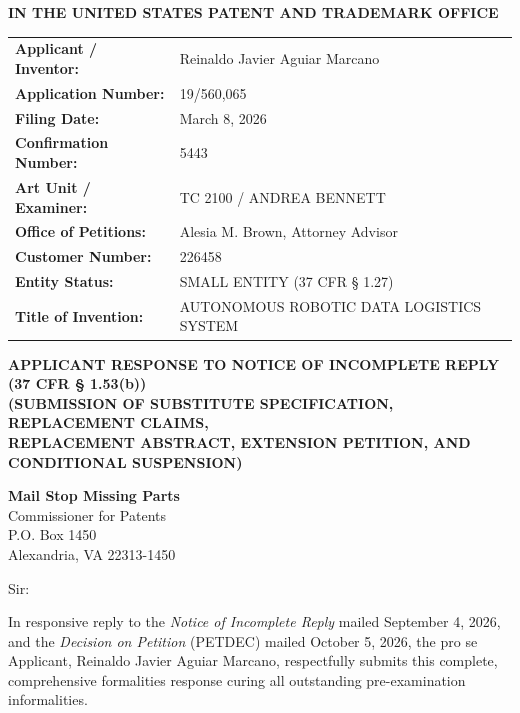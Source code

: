 \documentclass[11pt,letterpaper]{article}
\begin{document}
\thispagestyle{empty}

\begin{center}
    \textbf{\large IN THE UNITED STATES PATENT AND TRADEMARK OFFICE}
\end{center}

\vspace{0.3cm}
\noindent\begin{tabular}{p{2.3in}p{4.0in}}
\textbf{Applicant / Inventor:} & Reinaldo Javier Aguiar Marcano \\
\textbf{Application Number:} & 19/560,065 \\
\textbf{Filing Date:} & March 8, 2026 \\
\textbf{Confirmation Number:} & 5443 \\
\textbf{Art Unit / Examiner:} & TC 2100 / ANDREA BENNETT \\
\textbf{Office of Petitions:} & Alesia M. Brown, Attorney Advisor \\
\textbf{Customer Number:} & 226458 \\
\textbf{Entity Status:} & SMALL ENTITY (37 CFR \S{} 1.27) \\
\textbf{Title of Invention:} & AUTONOMOUS ROBOTIC DATA LOGISTICS SYSTEM \\
\end{tabular}

\vspace{0.4cm}
\begin{center}
    \textbf{\large APPLICANT RESPONSE TO NOTICE OF INCOMPLETE REPLY \\
    (37 CFR \S{} 1.53(b))} \\
    \textbf{\normalsize (SUBMISSION OF SUBSTITUTE SPECIFICATION, REPLACEMENT CLAIMS, \\
    REPLACEMENT ABSTRACT, EXTENSION PETITION, AND CONDITIONAL SUSPENSION)}
\end{center}

\noindent\textbf{Mail Stop Missing Parts} \\
Commissioner for Patents \\
P.O. Box 1450 \\
Alexandria, VA 22313-1450

\vspace{0.2cm}
Sir:

In responsive reply to the \textit{Notice of Incomplete Reply} mailed September 4, 2026, and the \textit{Decision on Petition} (PETDEC) mailed October 5, 2026, the pro se Applicant, Reinaldo Javier Aguiar Marcano, respectfully submits this complete, comprehensive formalities response curing all outstanding pre-examination informalities.
\end{document}
